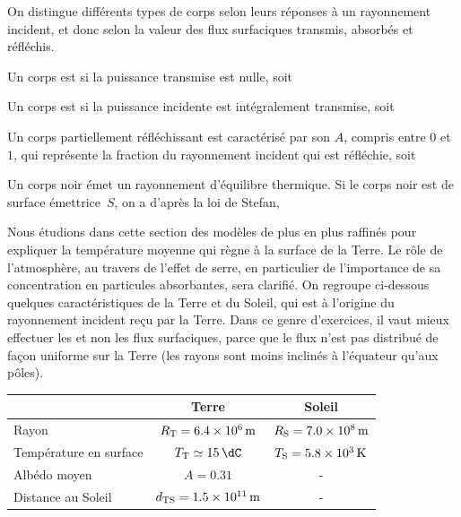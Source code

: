 \documentclass[12pt,fancy]{cours}
\begin{document}
On distingue différents types de corps selon leurs réponses à un rayonnement incident, et donc selon la valeur des flux surfaciques transmis, absorbés et réfléchis.
\begin{liste}
\item Un corps est  si la puissance transmise est nulle,
soit
\item Un corps est  si la puissance
incidente est int\'egralement transmise, soit
\item  Un corps partiellement réfléchissant est caractérisé par son  $A$,  compris entre $0$ et $1$, qui représente la fraction du rayonnement incident qui est réfléchie, soit
 \item Un corps noir émet un rayonnement d'équilibre thermique. Si le corps noir est de surface émettrice~$S$, on a  d'après la loi de Stefan,
\end{liste}



Nous étudions dans cette section des modèles de plus en plus raffinés pour expliquer la température moyenne qui règne à la surface de la Terre. Le rôle de l'atmosphère, au travers de l'effet de serre, en particulier de l'importance de sa concentration en particules absorbantes, sera clarifié.
On regroupe ci-dessous quelques caractéristiques de la Terre et du Soleil, qui est à l'origine du rayonnement incident reçu par la Terre. Dans ce genre d'exercices, il vaut mieux effectuer les  et non les flux surfaciques, parce que le flux n'est pas distribué de façon uniforme sur la Terre (les rayons sont moins inclinés à l'équateur qu'aux pôles).
\begin{center}
\begin{tabular}{l|c|c}
 & Terre & Soleil \\
\hline\hline
Rayon & $R_{\rm{T}}=\SI{6,4e6}{m}$ & $R_{\rm{S}}=\SI{7,0e8}{m}$ \\
Température en surface & $T_{\rm{T}} \simeq \SI{15}{\dC}$ & $T_{\rm{S}}=\SI{5,8e3}{K}$ \\
Albédo moyen & $A=\num{0.31}$ & - \\
Distance au Soleil & $d_{\rm{TS}}=\SI{1,5e11}{m}$ & - \\
\end{tabular}
\end{center}
\end{document}
